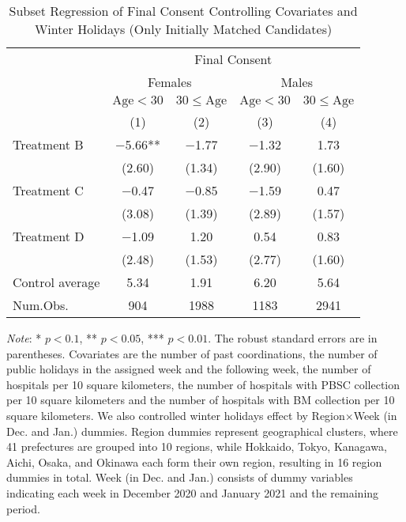 \documentclass[12pt, a4paper]{article}
\begin{document}
\begin{table}[H]

\caption{\label{tab:lm-consent-subset3-init}Subset Regression of Final Consent Controlling Covariates and Winter Holidays (Only Initially Matched Candidates)}
\centering
\fontsize{8}{10}\selectfont
\begin{threeparttable}
\begin{tabular}[t]{lcccc}
\toprule
\multicolumn{1}{c}{ } & \multicolumn{4}{c}{Final Consent} \\
\cmidrule(l{3pt}r{3pt}){2-5}
\multicolumn{1}{c}{ } & \multicolumn{2}{c}{Females} & \multicolumn{2}{c}{Males} \\
\cmidrule(l{3pt}r{3pt}){2-3} \cmidrule(l{3pt}r{3pt}){4-5}
\multicolumn{1}{c}{ } & \multicolumn{1}{c}{$\text{Age} < 30$} & \multicolumn{1}{c}{$30 \le \text{Age}$} & \multicolumn{1}{c}{$\text{Age} < 30$} & \multicolumn{1}{c}{$30 \le \text{Age}$} \\
\cmidrule(l{3pt}r{3pt}){2-2} \cmidrule(l{3pt}r{3pt}){3-3} \cmidrule(l{3pt}r{3pt}){4-4} \cmidrule(l{3pt}r{3pt}){5-5}
  & (1) & (2) & (3) & (4)\\
\midrule
Treatment B & \num{-5.66}** & \num{-1.77} & \num{-1.32} & \num{1.73}\\
 & (\num{2.60}) & (\num{1.34}) & (\num{2.90}) & (\num{1.60})\\
Treatment C & \num{-0.47} & \num{-0.85} & \num{-1.59} & \num{0.47}\\
 & (\num{3.08}) & (\num{1.39}) & (\num{2.89}) & (\num{1.57})\\
Treatment D & \num{-1.09} & \num{1.20} & \num{0.54} & \num{0.83}\\
 & (\num{2.48}) & (\num{1.53}) & (\num{2.77}) & (\num{1.60})\\
\midrule
Control average & 5.34 & 1.91 & 6.20 & 5.64\\
Num.Obs. & \num{904} & \num{1988} & \num{1183} & \num{2941}\\
\bottomrule
\end{tabular}
\begin{tablenotes}
\item \emph{Note}: * $p < 0.1$, ** $p < 0.05$, *** $p < 0.01$. The robust standard errors are in parentheses. Covariates are the number of past coordinations, the number of public holidays in the assigned week and the following week, the number of hospitals per 10 square kilometers, the number of hospitals with PBSC collection per 10 square kilometers and the number of hospitals with BM collection per 10 square kilometers. We also controlled winter holidays effect by Region$\times$Week (in Dec. and Jan.) dummies. Region dummies represent geographical clusters, where 41 prefectures are grouped into 10 regions, while Hokkaido, Tokyo, Kanagawa, Aichi, Osaka, and Okinawa each form their own region, resulting in 16 region dummies in total. Week (in Dec. and Jan.) consists of dummy variables indicating each week in December 2020 and January 2021 and the remaining period.
\end{tablenotes}
\end{threeparttable}
\end{table}
\end{document}
